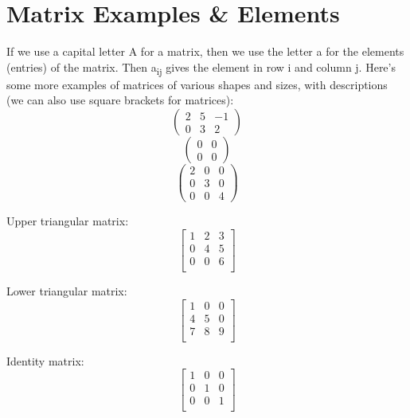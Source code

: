 \documentclass[a4paper,12pt]{article}
\begin{document}
\section{Matrix Examples \& Elements}
If we use a capital letter A for a matrix, then we use the letter a for the elements (entries) of the
matrix. Then a\textsubscript{ij} gives the element in row i and column j.
Here’s some more examples of matrices of various shapes and sizes, with descriptions (we can also use square brackets for matrices):
\[
\begin{pmatrix}
2 & 5 & -1 \\
0 & 3 & 2
\end{pmatrix}
\]
\[
\begin{pmatrix}
0 & 0 \\
0 & 0
\end{pmatrix}
\]
\[
\begin{pmatrix}
2 & 0 & 0 \\
0 & 3 & 0 \\
0 & 0 & 4
\end{pmatrix}
\]

Upper triangular matrix:
\[
\begin{bmatrix}
1 & 2 & 3 \\
0 & 4 & 5 \\
0 & 0 & 6 \\
\end{bmatrix}
\]

Lower triangular matrix:
\[
\begin{bmatrix}
1 & 0 & 0 \\
4 & 5 & 0 \\
7 & 8 & 9 \\
\end{bmatrix}
\]

Identity matrix:
\[
\begin{bmatrix}
1 & 0 & 0 \\
0 & 1 & 0 \\
0 & 0 & 1 \\
\end{bmatrix}
\]

\end{document}
